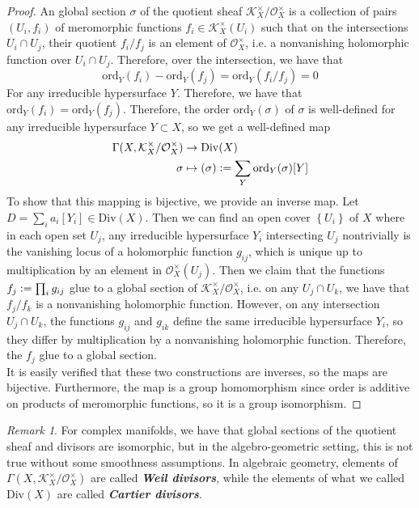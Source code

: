 \documentclass[psamsfonts, 12pt]{amsart}
\theoremstyle{definition}
\theoremstyle{remark}
\newtheorem*{rem*}{Remark}
\renewcommand{\O}{\mathcal{O}}
\newcommand{\ib}[1]{\textbf{\textit{#1}}}
\newcommand{\set}[1]{\left\lbrace #1 \right\rbrace}
\newcommand{\defeq}{\vcentcolon=}
\begin{document}
%
\begin{proof}
An global section $\sigma$ of the quotient sheaf $\mathcal{K}_X^\times / \O_X^\times$ is a
collection of pairs $(U_i, f_i)$ of meromorphic functions
$f_i \in \mathcal{K}_X^\times(U_i)$ such that on the intersections $U_i \cap U_j$, their
quotient  $f_i/f_j$ is an element of $\O_X^\times$, i.e. a nonvanishing holomorphic
function over $U_i \cap U_j$. Therefore, over the intersection, we have that
\[
\mathrm{ord}_Y(f_i) - \mathrm{ord}_Y(f_j) = \mathrm{ord}_Y(f_i/f_j) = 0
\]
For any irreducible hypersurface $Y$. Therefore, we have that
$\mathrm{ord}_Y(f_i) = \mathrm{ord}_Y(f_j)$. Therefore, the order
$\mathrm{ord}_Y(\sigma)$ of $\sigma$ is well-defined for any irreducible hypersurface
$Y \subset X$, so we get a well-defined map
\begin{align*}
\Gamma(X, \mathcal{K}^\times_X / \O_X^\times) &\to \mathrm{Div}(X) \\
\sigma &\mapsto (\sigma) \defeq \sum_Y \mathrm{ord}_Y(\sigma)[Y]
\end{align*}
To show that this mapping is bijective, we provide an inverse map. Let
$D = \sum_i a_i [Y_i] \in \mathrm{Div}(X)$. Then we can find an open cover $\set{U_i}$
of $X$ where in each open set $U_j$, any irreducible hypersurface $Y_i$ intersecting
$U_j$ nontrivially is the vanishing locus of a holomorphic function $g_{ij}$, which
is unique up to multiplication by an element in $\O_X^\times(U_j)$. Then we claim that
the functions $f_j \defeq \prod_i g_{ij}$ glue to a global section of
$\mathcal{K}_X^\times / \O_X^\times$, i.e. on any $U_j \cap U_k$, we have that
$f_j/f_k$ is a nonvanishing holomorphic function. However, on any intersection
$U_j \cap U_k$, the functions $g_{ij}$ and $g_{ik}$ define the same irreducible
hypersurface $Y_i$, so they differ by multiplication by a nonvanishing holomorphic
function. Therefore, the $f_j$ glue to a global section. \\

It is easily verified that these two constructions are inverses, so the maps
are bijective. Furthermore, the map is a group homomorphism since order is
additive on products of meromorphic functions, so it is a group isomorphism.
\end{proof}
%
\begin{rem*}
For complex manifolds, we have that global sections of the quotient sheaf and divisors
are isomorphic, but in the algebro-geometric setting, this is not true without some
smoothness assumptions. In algebraic geometry, elements of
$\Gamma(X, \mathcal{K}_X^\times/\mathcal{O}_X^\times)$ are called \ib{Weil divisors},
while the elements of what we called $\mathrm{Div}(X)$ are called \ib{Cartier divisors}.
\end{rem*}
\end{document}
